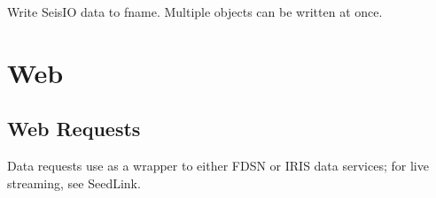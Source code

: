 \documentclass[letterpaper,11pt,english]{sphinxmanual}
\begin{document}
\begin{fulllineitems}
\label{\detokenize{src/Formats/fileformats:wseis}}
\end{fulllineitems}


\begin{fulllineitems}
\end{fulllineitems}


Write SeisIO data to fname. Multiple objects can be written at once.


\chapter{Web}
\label{\detokenize{index:web}}

\section{Web Requests}
\label{\detokenize{src/Web/webclients:web-requests}}\label{\detokenize{src/Web/webclients::doc}}
Data requests use  as a wrapper to either FDSN or IRIS data services; for live streaming, see SeedLink.


\begin{fulllineitems}
\end{fulllineitems}



\begin{fulllineitems}
\end{fulllineitems}
\end{document}
